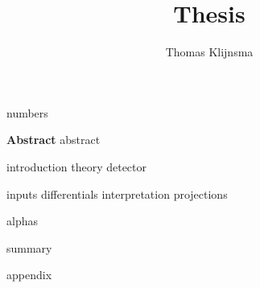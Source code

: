 \documentclass[draftmode]{main}
\begin{document}
\title{Thesis}
\author{Thomas Klijnsma}
\maketitle

{numbers}

\textbf{Abstract}
{abstract}

\tableofcontents

{introduction}
{theory}
{detector}

{inputs}
{differentials}
{interpretation}
{projections}

{alphas}

{summary}




\appendix
{appendix}
\end{document}
